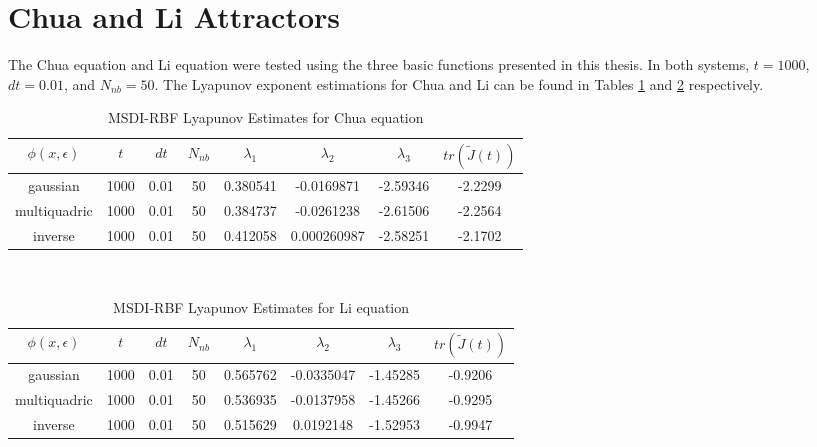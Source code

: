         \section{Chua and Li Attractors}

                The Chua equation and Li equation were tested using the three basic functions presented in this thesis. In both systems,
                $t=1000$,  $dt=0.01$, and $N_{nb}=50$. The Lyapunov
                exponent estimations for Chua and Li can be found in Tables \ref{table:chuaest} and \ref{table:liest} respectively.\\
                \begin{table}
                    \centering
                    \begin{tabular}[h]{||c c c c c c c c||}
                        \hline
                        $\phi (x,\epsilon)$ & $t$ & $dt$ & $N_{nb}$ & $\lambda_1$ & $\lambda_2$ & $\lambda_3$ & $tr(\tilde{J}(t))$ \\
                        \hline
                        gaussian & 1000 & 0.01 & 50 & 0.380541 & -0.0169871  &  -2.59346 & -2.2299\\
                        \hline
                        multiquadric & 1000 & 0.01 & 50 & 0.384737 & -0.0261238 &   -2.61506 & -2.2564\\
                        \hline
                        inverse & 1000 & 0.01 & 50 & 0.412058 & 0.000260987 &   -2.58251 & -2.1702\\ [1ex]
                        \hline
                    \end{tabular}\\
                    \caption{MSDI-RBF Lyapunov Estimates for Chua equation}\label{table:chuaest}
                \end{table}
                \begin{table}
                    \centering
                    \begin{tabular}[h]{||c c c c c c c c||}
                        \hline
                        $\phi (x,\epsilon)$ & $t$ & $dt$ & $N_{nb}$ & $\lambda_1$ & $\lambda_2$ & $\lambda_3$ & $tr(\tilde{J}(t))$ \\
                        \hline
                        gaussian & 1000 & 0.01 & 50 & 0.565762 & -0.0335047  &  -1.45285 & -0.9206\\
                        \hline
                        multiquadric & 1000 & 0.01 & 50 & 0.536935 & -0.0137958  &  -1.45266 & -0.9295\\
                        \hline
                        inverse & 1000 & 0.01 & 50 & 0.515629 &  0.0192148  &  -1.52953 & -0.9947\\ [1ex]
                        \hline
                    \end{tabular}\\
                    \caption{MSDI-RBF Lyapunov Estimates for Li equation}\label{table:liest}
                \end{table}

